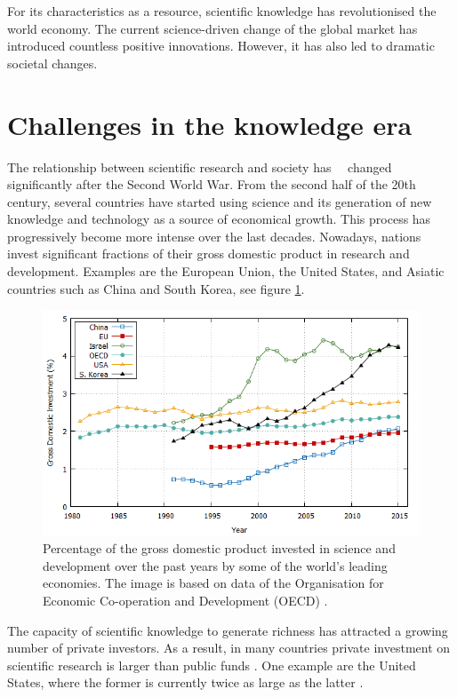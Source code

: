 For its characteristics as a resource, scientific knowledge has revolutionised the world economy. The current science-driven change of the global market has introduced countless positive innovations. However, it has also led to dramatic societal changes.   

\section{Challenges in the knowledge era} \label{Challenges_in_the_knowledge_era}
The relationship between scientific research and society has \, \, changed significantly after the Second World War. From the second half of the 20th century, several countries have started using science and its generation of new knowledge and technology as a source of economical growth. This process has progressively become more intense over the last decades. Nowadays, nations invest significant fractions of their gross domestic product in research and development. Examples are the European Union, the United States, and Asiatic countries such as China and South Korea, see figure \ref{GD_investment}.    

\begin{figure}[!t] 
 \begin{center}
 \includegraphics[scale=0.5]{Images/GD_investment.png}
 \caption{Percentage of the gross domestic product invested in science and development over the past years by some of the world's leading economies. The image is based on data of the Organisation for Economic Co-operation and Development (OECD) \cite{OECD}.}
 \label{GD_investment}
 \end{center}
\end{figure}

The capacity of scientific knowledge to generate richness has attracted a growing number of private investors. As a result, in many countries private investment on scientific research is larger than public funds \cite{UNESCO}. One example are the United States, where the former is currently twice as large as the latter \cite{Boroush}. 

